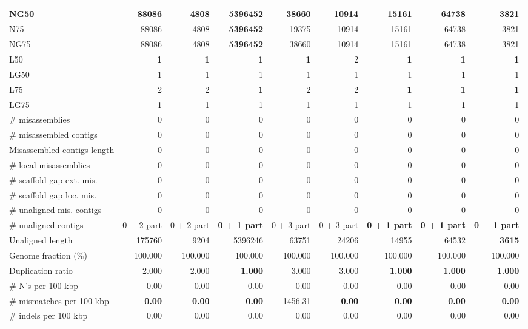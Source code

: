 \documentclass[12pt,a4paper]{article}
\begin{document}
\begin{table}[ht]
\begin{center}
\begin{tabular}{|l*{8}{|r}|}
NG50 & 88086 & 4808 & {\bf 5396452} & 38660 & 10914 & 15161 & 64738 & 3821 \\ \hline
N75 & 88086 & 4808 & {\bf 5396452} & 19375 & 10914 & 15161 & 64738 & 3821 \\ \hline
NG75 & 88086 & 4808 & {\bf 5396452} & 38660 & 10914 & 15161 & 64738 & 3821 \\ \hline
L50 & {\bf 1} & {\bf 1} & {\bf 1} & {\bf 1} & 2 & {\bf 1} & {\bf 1} & {\bf 1} \\ \hline
LG50 & 1 & 1 & 1 & 1 & 1 & 1 & 1 & 1 \\ \hline
L75 & 2 & 2 & {\bf 1} & 2 & 2 & {\bf 1} & {\bf 1} & {\bf 1} \\ \hline
LG75 & 1 & 1 & 1 & 1 & 1 & 1 & 1 & 1 \\ \hline
\# misassemblies & 0 & 0 & 0 & 0 & 0 & 0 & 0 & 0 \\ \hline
\# misassembled contigs & 0 & 0 & 0 & 0 & 0 & 0 & 0 & 0 \\ \hline
Misassembled contigs length & 0 & 0 & 0 & 0 & 0 & 0 & 0 & 0 \\ \hline
\# local misassemblies & 0 & 0 & 0 & 0 & 0 & 0 & 0 & 0 \\ \hline
\# scaffold gap ext. mis. & 0 & 0 & 0 & 0 & 0 & 0 & 0 & 0 \\ \hline
\# scaffold gap loc. mis. & 0 & 0 & 0 & 0 & 0 & 0 & 0 & 0 \\ \hline
\# unaligned mis. contigs & 0 & 0 & 0 & 0 & 0 & 0 & 0 & 0 \\ \hline
\# unaligned contigs & 0 + 2 part & 0 + 2 part & {\bf 0 + 1 part} & 0 + 3 part & 0 + 3 part & {\bf 0 + 1 part} & {\bf 0 + 1 part} & {\bf 0 + 1 part} \\ \hline
Unaligned length & 175760 & 9204 & 5396246 & 63751 & 24206 & 14955 & 64532 & {\bf 3615} \\ \hline
Genome fraction (\%) & 100.000 & 100.000 & 100.000 & 100.000 & 100.000 & 100.000 & 100.000 & 100.000 \\ \hline
Duplication ratio & 2.000 & 2.000 & {\bf 1.000} & 3.000 & 3.000 & {\bf 1.000} & {\bf 1.000} & {\bf 1.000} \\ \hline
\# N's per 100 kbp & 0.00 & 0.00 & 0.00 & 0.00 & 0.00 & 0.00 & 0.00 & 0.00 \\ \hline
\# mismatches per 100 kbp & {\bf 0.00} & {\bf 0.00} & {\bf 0.00} & 1456.31 & {\bf 0.00} & {\bf 0.00} & {\bf 0.00} & {\bf 0.00} \\ \hline
\# indels per 100 kbp & 0.00 & 0.00 & 0.00 & 0.00 & 0.00 & 0.00 & 0.00 & 0.00 \\ \hline

\end{tabular}
\end{center}
\end{table}
\end{document}
